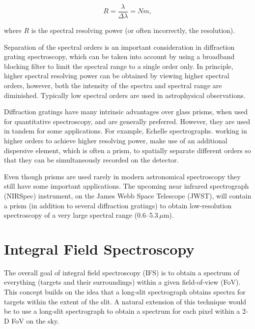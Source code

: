 \begin{equation}
    R = \frac{\lambda}{\Delta\lambda} = Nm,\label{eq:g}
\end{equation}

\noindent where $R$ is the spectral resolving power (or often incorrectly, the resolution).

Separation of the spectral orders is an important consideration in diffraction grating spectroscopy, which can be taken into account by using a broadband blocking filter to limit the spectral range to a single order only.
In principle, higher spectral resolving power can be obtained by viewing higher spectral orders, however, both the intensity of the spectra and spectral range are diminished.
Typically low spectral orders are used in astrophysical observations.

Diffraction gratings have many intrinsic advantages over glass prisms, when used for quantitative spectroscopy, and are generally preferred.
However, they are used in tandem for some applications.
For example, Echelle spectrographs. working in higher orders to achieve higher resolving power, make use of an additional dispersive element, which is often a prism, to spatially separate different orders so that they can be simultaneously recorded on the detector.


Even though prisms are used rarely in modern astronomical spectroscopy they still have some important applications.
The upcoming near infrared spectrograph (NIRSpec) instrument, on the James Webb Space Telescope (JWST), will contain a prism (in addition to several diffraction gratings) to obtain low-resolution spectroscopy of a very large spectral range (0.6--5.3\,$\mu$m).


\section{Integral Field Spectroscopy} %
\label{sec:IFS}

The overall goal of integral field spectroscopy (IFS) is to obtain a spectrum of everything (targets and their surroundings) within a given field-of-view (FoV).
This concept builds on the idea that a long-slit spectrograph obtains spectra for targets within the extent of the slit.
A natural extension of this technique would be to use a long-slit spectrograph to obtain a spectrum for each pixel within a 2-D FoV on the sky.

